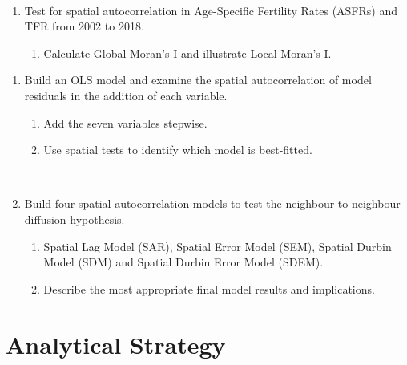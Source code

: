 \documentclass[12pt,twoside]{reedthesis}
\providecommand{\tightlist}{%
  \setlength{\itemsep}{0pt}\setlength{\parskip}{0pt}}
\begin{document}
~
\begin{enumerate}
\def\labelenumi{\arabic{enumi}.}
\tightlist
\item
  Test for spatial autocorrelation in Age-Specific Fertility Rates (ASFRs) and TFR from 2002 to 2018.
  \begin{enumerate}
  \def\labelenumii{\roman{enumii})}
  \tightlist
  \item
    Calculate Global Moran's I and illustrate Local Moran's I.
    ~
  \end{enumerate}
\end{enumerate}
\begin{enumerate}
\def\labelenumi{\arabic{enumi}.}
\setcounter{enumi}{1}
\tightlist
\item
  Build an OLS model and examine the spatial autocorrelation of model residuals in the addition of each variable.
  \begin{enumerate}
  \def\labelenumii{\roman{enumii})}
  \tightlist
  \item
    Add the seven variables stepwise.
  \item
    Use spatial tests to identify which model is best-fitted.

    ~
  \end{enumerate}
\item
  Build four spatial autocorrelation models to test the neighbour-to-neighbour diffusion hypothesis.
  \begin{enumerate}
  \def\labelenumii{\roman{enumii})}
  \tightlist
  \item
    Spatial Lag Model (SAR), Spatial Error Model (SEM), Spatial Durbin Model (SDM) and Spatial Durbin Error Model (SDEM).
  \item
    Describe the most appropriate final model results and implications.
  \end{enumerate}
\end{enumerate}
\hypertarget{Analytical}{%
\chapter{Analytical Strategy}\label{Analytical}}
\end{document}
